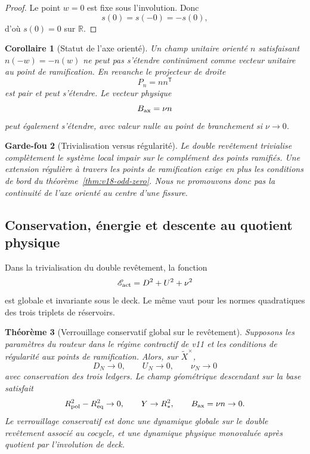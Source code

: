 \documentclass[11pt,a4paper]{article}
\newtheorem{theorem}{Théorème}[section]
\newtheorem{corollary}[theorem]{Corollaire}
\newtheorem{guardrail}[theorem]{Garde-fou}
\begin{document}
\begin{proof}
Le point $w=0$ est fixe sous l'involution. Donc
\[
 s(0)=s(-0)=-s(0),
\]
d'où $s(0)=0$ sur $\mathbb R$.
\end{proof}

\begin{corollary}[Statut de l'axe orienté]\label{cor:v18-axis-branch}
Un champ unitaire orienté $n$ satisfaisant $n(-w)=-n(w)$ ne peut pas s'étendre continûment comme vecteur unitaire au point de ramification. En revanche le projecteur de droite
\[
 P_n=nn^{\mathsf T}
\]
est pair et peut s'étendre. Le vecteur physique
\[
 B_{\rm ax}=\nu n
\]
peut également s'étendre, avec valeur nulle au point de branchement si $\nu\to0$.
\end{corollary}

\begin{guardrail}[Trivialisation versus régularité]
Le double revêtement trivialise complètement le \emph{système local} impair sur le complément des points ramifiés. Une extension régulière à travers les points de ramification exige en plus les conditions de bord du théorème~\ref{thm:v18-odd-zero}. Nous ne promouvons donc pas la continuité de l'axe orienté au centre d'une fissure.
\end{guardrail}

\subsection{Conservation, énergie et descente au quotient physique}

Dans la trivialisation du double revêtement, la fonction
\[
 \mathscr E_{\rm act}=D^2+U^2+\nu^2
\]
est globale et invariante sous le deck. Le même vaut pour les normes quadratiques des trois triplets de réservoirs.

\begin{theorem}[Verrouillage conservatif global sur le revêtement]\label{thm:v18-global-lock}
Supposons les paramètres du routeur dans le régime contractif de v11 et les conditions de régularité aux points de ramification. Alors, sur $\widetilde X^\times$,
\[
 D_N\to0,\qquad U_N\to0,\qquad \nu_N\to0
\]
avec conservation des trois ledgers. Le champ géométrique descendant sur la base satisfait
\[
 R_{\rm pol}^2-R_{\rm eq}^2\to0,
 \qquad
 Y\to R_*^2,
 \qquad
 B_{\rm ax}=\nu n\to0.
\]
Le verrouillage conservatif est donc une dynamique globale sur le double revêtement associé au cocycle, et une dynamique physique monovaluée après quotient par l'involution de deck.
\end{theorem}
\end{document}
